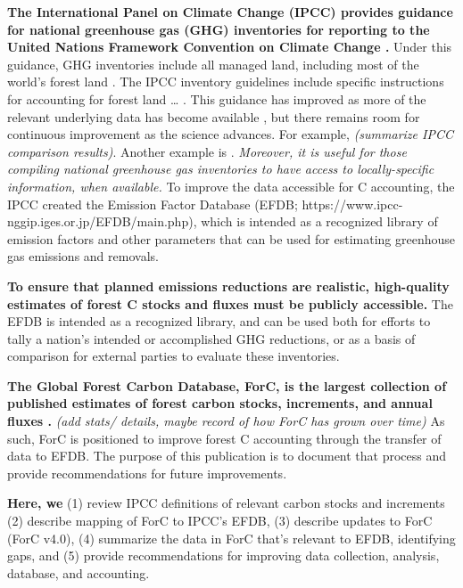 \documentclass[, manuscript]{copernicus}
\begin{document}
\textbf{The International Panel on Climate Change (IPCC) provides
guidance for national greenhouse gas (GHG) inventories for reporting to
the United Nations Framework Convention on Climate Change \citep[UNFCCC,
(REFS for older guidelines),][]{ipcc_2019_2019}.} Under this guidance,
GHG inventories include all managed land, including most of the world's
forest land \citep{ogle_delineating_2018}. The IPCC inventory guidelines
include specific instructions for accounting for forest land \ldots{}
\citep{ipcc_agriculture_2006, ipcc_2019_2019a}. This guidance has
improved as more of the relevant underlying data has become available
\citep{requenasuarez_estimating_2019}, but there remains room for
continuous improvement as the science advances. For example,
\citet{cook-patton_mapping_2020} \emph{(summarize IPCC comparison
results)}. Another example is \citet{cuni-sanchez_high_2021}.
\emph{Moreover, it is useful for those compiling national greenhouse gas
inventories to have access to locally-specific information, when
available.} To improve the data accessible for C accounting, the IPCC
created the Emission Factor Database (EFDB;
https://www.ipcc-nggip.iges.or.jp/EFDB/main.php), which is intended as a
recognized library of emission factors and other parameters that can be
used for estimating greenhouse gas emissions and removals.

\textbf{To ensure that planned emissions reductions are realistic,
high-quality estimates of forest C stocks and fluxes must be publicly
accessible.} The EFDB is intended as a recognized library, and can be
used both for efforts to tally a nation's intended or accomplished GHG
reductions, or as a basis of comparison for external parties to evaluate
these inventories.

\textbf{The Global Forest Carbon Database, ForC, is the largest
collection of published estimates of forest carbon stocks, increments,
and annual fluxes
\citep{anderson-teixeira_forc_2018, anderson-teixeira_carbon_2021}.}
\emph{(add stats/ details, maybe record of how ForC has grown over
time)} As such, ForC is positioned to improve forest C accounting
through the transfer of data to EFDB. The purpose of this publication is
to document that process and provide recommendations for future
improvements.

\textbf{Here, we} (1) review IPCC definitions of relevant carbon stocks
and increments (2) describe mapping of ForC to IPCC's EFDB, (3) describe
updates to ForC (ForC v4.0), (4) summarize the data in ForC that's
relevant to EFDB, identifying gaps, and (5) provide recommendations for
improving data collection, analysis, database, and accounting.
\end{document}
